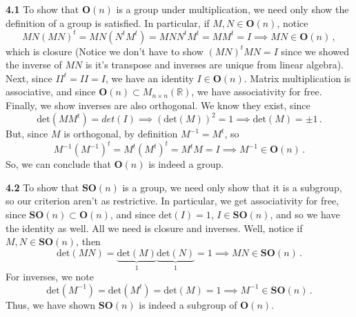 \documentclass[10pt]{article}
\newcommand{\R}{\mathbb{R}}
\begin{document}
\textbf{4.1}  To show that $\textbf{O}(n)$ is a group under multiplication, we need only show the definition of a group is satisfied. In particular, if $M,N \in \textbf{O}(n)$, notice
\[ MN(MN)^{t} = MN(N^{t}M^{t}) = MNN^{t}M^{t} = MM^{t} = I \implies MN \in \textbf{O}(n) \, ,\]
which is closure (Notice we don't have to show $(MN)^{t}MN = I$ since we showed the inverse of $MN$ is it's transpose and inverses are unique from linear algebra). Next, since $II^{t} = II = I$, we have an identity $I\in \textbf{O}(n)$. Matrix multiplication is associative, and since $\textbf{O}(n) \subset M_{n\times n}(\R)$, we have associativity for free. Finally, we show inverses are also orthogonal. We know they exist, since
\[ \text{det}(MM^{t}) = det(I) \implies (\text{det}(M))^{2} = 1 \implies \text{det}(M) = \pm 1\, .\]
But, since $M$ is orthogonal, by definition $M^{-1} = M^{t}$, so
\[ M^{-1}(M^{-1})^{t} = M^{t}(M^{t})^{t} = M^{t}M = I  \implies M^{-1} \in \textbf{O}(n)\, .\]
So, we can conclude that $\textbf{O}(n)$ is indeed a group.

\textbf{4.2} To show that $\textbf{SO}(n)$ is a group, we need only show that it is a subgroup, so our criterion aren't as restrictive. In particular, we get associativity for free, since $\textbf{SO}(n) \subset \textbf{O}(n)$, and since $\text{det}(I) = 1$, $I \in \textbf{SO}(n)$, and so we have the identity as well. All we need is closure and inverses. Well, notice if $M,N \in \textbf{SO}(n)$, then
\[ \text{det}(MN) = \underbrace{\text{det}(M)}_{1}\underbrace{\text{det}(N)}_{1} = 1 \implies MN \in \textbf{SO}(n) \, .\]
For inverses, we note
\[ \text{det}(M^{-1}) = \text{det}(M^{t}) = \text{det}(M) = 1 \implies M^{-1} \in \textbf{SO}(n)\, .\]
Thus, we have shown $\textbf{SO}(n)$ is indeed a subgroup of $\textbf{O}(n)$.
\end{document}
